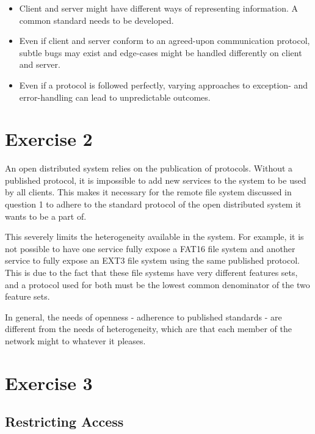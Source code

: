 \documentclass[a4paper]{article}
\begin{document}
\begin{itemize}

    \item Client and server might have different ways of representing information. A common standard needs to be developed.

    \item Even if client and server conform to an agreed-upon communication protocol, subtle bugs may exist and edge-cases might be handled differently on client and server.

    \item Even if a protocol is followed perfectly, varying approaches to exception- and error-handling can lead to unpredictable outcomes.

\end{itemize}

\section{Exercise 2}

An open distributed system relies on the publication of protocols. Without a published protocol, it is impossible to add new services to the system to be used by all clients. This makes it necessary for the remote file system discussed in question 1 to adhere to the standard protocol of the open distributed system it wants to be a part of.

This severely limits the heterogeneity available in the system. For example, it is not possible to have one service fully expose a FAT16 file system and another service to fully expose an EXT3 file system using the same published protocol. This is due to the fact that these file systems have very different features sets, and a protocol used for both must be the lowest common denominator of the two feature sets.

In general, the needs of openness - adherence to published standards - are different from the needs of heterogeneity, which are that each member of the network might to whatever it pleases.

\section{Exercise 3}

\subsection{Restricting Access}
\end{document}

